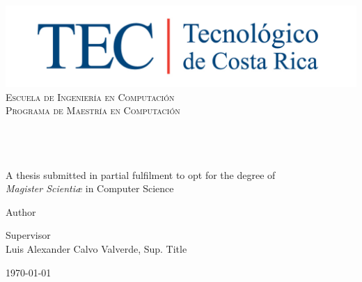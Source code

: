 \begin{titlepage}

\begin{center}

\vfill


\includegraphics[width=1\textwidth]{../images/TECRGB.jpg}
\\[0.2cm]
\textcolor{tecblue}{
\textsc{\LARGE Escuela de Ingeniería en Computación}\\[0.2cm]
\textsc{\large Programa de Maestría en Computación}\\
}
\vfill
 
\HRule
\\[0.9cm]
\doublespacing
{ \huge \bfseries \thesistitle}
\\[0.4cm]
\singlespacing
\HRule
\\[0.9cm]

{\large A thesis submitted in partial fulfilment to opt for the degree of 
\\[1cm]
\textit{Magister Scientiæ} in Computer Science}
\\
\vfill
 
\begin{minipage}{0.45\textwidth}
\begin{flushleft} \large
Author\\
\pdfauthor 
\end{flushleft}
\end{minipage}
\begin{minipage}{0.50\textwidth}
\begin{flushright} \large
Supervisor\\
{Luis Alexander Calvo Valverde, Sup. Title}
\end{flushright}
\end{minipage}
 
 
\vfill
 
{\large \today \\}  \hfill{} 


\end{center}
\end{titlepage}

